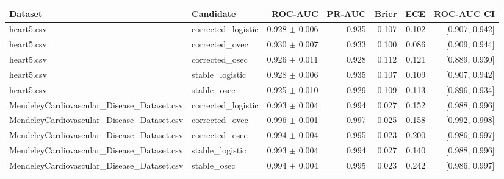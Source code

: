 \begin{tabular}{llrrrrr}
\toprule
Dataset & Candidate & ROC-AUC & PR-AUC & Brier & ECE & ROC-AUC CI \\
\midrule
heart5.csv & corrected\_logistic & 0.928 $\pm$ 0.006 & 0.935 & 0.107 & 0.102 & [0.907, 0.942] \\
heart5.csv & corrected\_ovec & 0.930 $\pm$ 0.007 & 0.933 & 0.100 & 0.086 & [0.909, 0.944] \\
heart5.csv & corrected\_osec & 0.926 $\pm$ 0.011 & 0.928 & 0.112 & 0.121 & [0.889, 0.930] \\
heart5.csv & stable\_logistic & 0.928 $\pm$ 0.006 & 0.935 & 0.107 & 0.109 & [0.907, 0.942] \\
heart5.csv & stable\_osec & 0.925 $\pm$ 0.010 & 0.929 & 0.109 & 0.113 & [0.896, 0.934] \\
MendeleyCardiovascular\_Disease\_Dataset.csv & corrected\_logistic & 0.993 $\pm$ 0.004 & 0.994 & 0.027 & 0.152 & [0.988, 0.996] \\
MendeleyCardiovascular\_Disease\_Dataset.csv & corrected\_ovec & 0.996 $\pm$ 0.001 & 0.997 & 0.025 & 0.158 & [0.992, 0.998] \\
MendeleyCardiovascular\_Disease\_Dataset.csv & corrected\_osec & 0.994 $\pm$ 0.004 & 0.995 & 0.023 & 0.200 & [0.986, 0.997] \\
MendeleyCardiovascular\_Disease\_Dataset.csv & stable\_logistic & 0.993 $\pm$ 0.004 & 0.994 & 0.027 & 0.140 & [0.988, 0.996] \\
MendeleyCardiovascular\_Disease\_Dataset.csv & stable\_osec & 0.994 $\pm$ 0.004 & 0.995 & 0.023 & 0.242 & [0.986, 0.997] \\
\bottomrule
\end{tabular}
